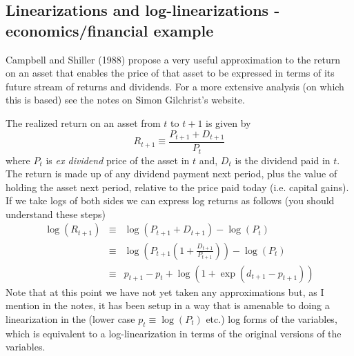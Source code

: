 \documentclass[authoryear,11pt]{elsarticle}
\begin{document}
\subsection{Linearizations and log-linearizations - economics/financial example}
Campbell and Shiller (1988) propose a very useful approximation to the return on an asset that enables the price of that asset to be expressed in terms of its future stream of returns and dividends. For a more extensive analysis (on which this is based) see the notes on Simon Gilchrist's website.

The realized return on an asset from $t$ to $t+1$ is given by
\[
R_{t+1} \equiv \frac{P_{t+1} + D_{t+1}}{P_{t}}
\]
where $P_{t}$ is \emph{ex dividend} price of the asset in $t$ and, $D_{t}$ is the dividend paid in $t$. The return is made up of any dividend payment next period, plus the value of holding the asset next period, relative to the price paid today (i.e. capital gains). If we take logs of both sides we can express log returns as follows (you should understand these steps)
\begin{eqnarray}
\log{(R_{t+1})} 	&\equiv& \log{(P_{t+1} + D_{t+1})} - \log{(P_{t})}		\nonumber		\\
				&\equiv& \log{(P_{t+1}(1 + \frac{D_{t+1}}{P_{t+1}}))} - \log{(P_{t})}\nonumber \\
				&\equiv& p_{t+1} - p_{t} + \log{(1+ \exp{(d_{t+1} - p_{t+1})})} \label{eqn:log_ret}
\end{eqnarray}
Note that at this point we have not yet taken any approximations but, as I mention in the notes, it has been setup in a way that is amenable to doing a linearization in the (lower case $p_{t}\equiv\log{(P_{t})}$ etc.) log forms of the variables, which is equivalent to a log-linearization in terms of the original versions of the variables.
\end{document}

